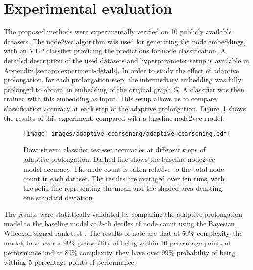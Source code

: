\section{Experimental evaluation}\label{sec:experimental-evaluation}

The proposed methods were experimentally verified on 10 publicly available datasets. The node2vec algorithm was used for generating the node embeddings, with an MLP classifier providing the predictions for node classification. A detailed description of the used datasets and hyperparameter setup is available in Appendix \ref{sec:app:experiment-details}. In order to study the effect of adaptive prolongation, for each prolongation step, the intermediary embedding was fully prolonged to obtain an embedding of the original graph \( G \). A classifier was then trained with this embedding as input. This setup allows us to compare classification accuracy at each step of the adaptive prolongation. Figure~\ref{fig:adaptive-coarsening} shows the results of this experiment, compared with a baseline node2vec model.

\begin{figure}
  \centering
  \texttt{[image: images/adaptive-coarsening/adaptive-coarsening.pdf]}
  \caption{Downstream classifier test-set accuracies at different steps of adaptive prolongation. Dashed line shows the baseline node2vec model accuracy. The node count is taken relative to the total node count in each dataset. The results are averaged over ten runs, with the solid line representing the mean and the shaded area denoting one standard deviation.}
  \label{fig:adaptive-coarsening}
\end{figure}

The results were statistically validated by comparing the adaptive prolongation model to the baseline model at \( k \)-th deciles of node count using the Bayesian Wilcoxon signed-rank test \cite{benavoli_bayesian_2014}. The results of note are that at 60\% complexity, the models have over a 99\% probability of being within 10 percentage points of performance and at 80\% complexity, they have over 99\% probability of being withing 5 percentage points of performance.
